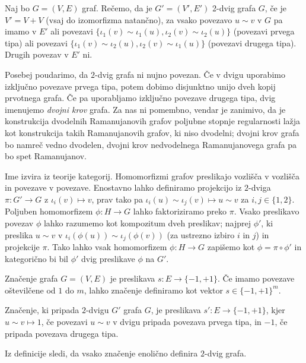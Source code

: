 \begin{definicija}
    Naj bo \(G = (V, E)\) graf. Rečemo, da je \(G'= (V', E')\) 2-dvig grafa \(G\), če je \(V' = V + V\) (vsaj do izomorfizma natančno), za vsako povezavo \(u\sim v\) v \(G\) pa imamo v \(E'\) ali povezavi \(\{\iota_1(v)\sim \iota_1(u), \iota_2(v)\sim \iota_2(u)\}\) (povezavi prvega tipa) ali povezavi \(\{\iota_1(v)\sim \iota_2(u), \iota_2(v)\sim \iota_1(u)\}\) (povezavi drugega tipa). Drugih povezav v \(E'\) ni.
\end{definicija}

Posebej poudarimo, da \(2\)-dvig grafa ni nujno povezan. Če v dvigu uporabimo izključno povezave prvega tipa, potem dobimo disjunktno unijo dveh kopij prvotnega grafa. Če pa uporabljamo izključno povezave drugega tipa, dvig imenujemo \emph{dvojni krov} grafa. Za nas ni pomembno, vendar je zanimivo, da je konstrukcija dvodelnih Ramanujanovih grafov poljubne stopnje regularnosti lažja kot konstrukcija takih Ramanujanovih grafov, ki niso dvodelni; dvojni krov grafa bo namreč vedno dvodelen, dvojni krov nedvodelnega Ramanujanovega grafa pa bo spet Ramanujanov.

Ime izvira iz teorije kategorij. Homomorfizmi grafov preslikajo vozlišča v vozlišča in povezave v povezave. Enostavno lahko definiramo projekcijo iz \(2\)-dviga \(\pi: G'\to G\) z \(\iota_i(v)\mapsto v\), prav tako pa \(\iota_i(u)\sim\iota_j(v)\mapsto u\sim v\) za \(i, j\in \{1,2\}\). Poljuben homomorfizem \(\phi: H\to G\) lahko faktoriziramo preko \(\pi\). Vsako preslikavo povezav \(\phi\) lahko razumemo kot kompozitum dveh preslikav; najprej \(\phi'\), ki preslika \(u\sim v\) v \(\iota_i(\phi(u)) \sim \iota_j(\phi(v))\) (za ustrezno izbiro \(i\) in \(j\)) in projekcije \(\pi\). Tako lahko vsak homomorfizem \(\phi: H\to G\) zapišemo kot \(\phi = \pi\circ \phi'\) in kategorično bi bil \(\phi'\) dvig preslikave \(\phi\) na \(G'\).

\begin{definicija}
    Značenje grafa \(G = (V, E)\) je preslikava \(s: E\to \{-1, +1\}\). Če imamo povezave oštevilčene od \(1\) do \(m\), lahko značenje definiramo kot vektor \(s\in \{-1, +1\}^m\).

    Značenje, ki pripada \(2\)-dvigu \(G'\) grafa \(G\), je preslikava \(s': E \to \{-1, +1\}\), kjer \(u\sim v \mapsto 1\), če povezavi \(u\sim v\) v dvigu pripada povezava prvega tipa, in \(-1\), če pripada povezava drugega tipa.
\end{definicija}

Iz definicije sledi, da vsako značenje enolično definira \(2\)-dvig grafa.

